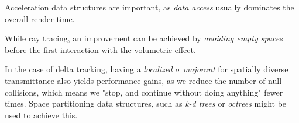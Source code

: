 Acceleration data structures are important, as \textit{data access} usually dominates the overall render time.

While ray tracing, an improvement can be achieved by \textit{avoiding empty spaces} before the first interaction with the volumetric effect.

In the case of delta tracking, having a \textit{localized $\bar\sigma$ majorant} for spatially diverse transmittance also yields performance gains, as we reduce the number of null collisions, which means we "stop, and continue without doing anything" fewer times. Space partitioning data structures, such as \textit{k-d trees}\cite{yue2010unbiased} or \textit{octrees}\cite{kutz2017spectral} might be used to achieve this.
